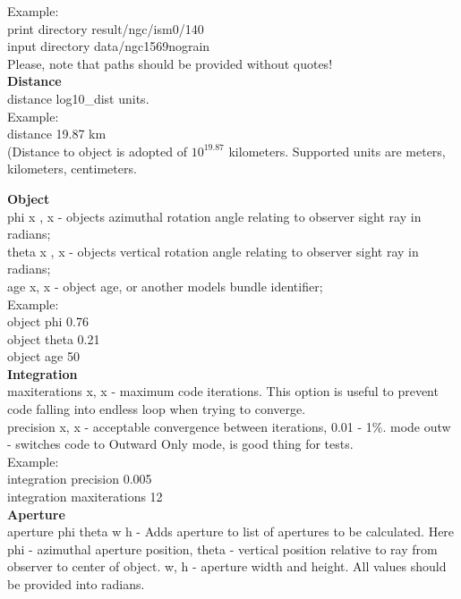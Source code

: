\documentclass[a4paper]{article}
\begin{document}
Example:\\
print directory result/ngc/ism0/140\\
input directory data/ngc1569nograin\\
Please, note that paths should be provided without quotes!\\

{\bf Distance}\\
distance log10\_dist units.\\

Example:\\ 
distance 19.87 km \\
(Distance to object is adopted of $10^{19.87}$ kilometers.
Supported units are meters, kilometers, centimeters.

{\bf Object}\\
phi x , x - objects azimuthal rotation angle relating to observer sight ray in radians;\\
theta x , x - objects vertical rotation angle relating to observer sight ray in radians;\\
age x, x - object age, or another models bundle identifier;\\

Example:\\
object phi 0.76\\
object theta 0.21\\
object age 50\\

{\bf Integration}\\
maxiterations x, x - maximum code iterations. This option is useful to prevent code
falling into endless loop when trying to converge.\\
precision x, x - acceptable convergence between iterations, 0.01 - 1\%.
mode outw - switches code to Outward Only mode, is good thing for tests.\\

Example:\\
integration precision 0.005\\
integration maxiterations 12\\

{\bf Aperture}\\

aperture phi theta w h - Adds aperture to list of apertures to be calculated. 
Here phi - azimuthal aperture position, theta - vertical position relative to ray
from observer to center of object. w, h - aperture width and height. All values
should be provided into radians.\\
\end{document}
